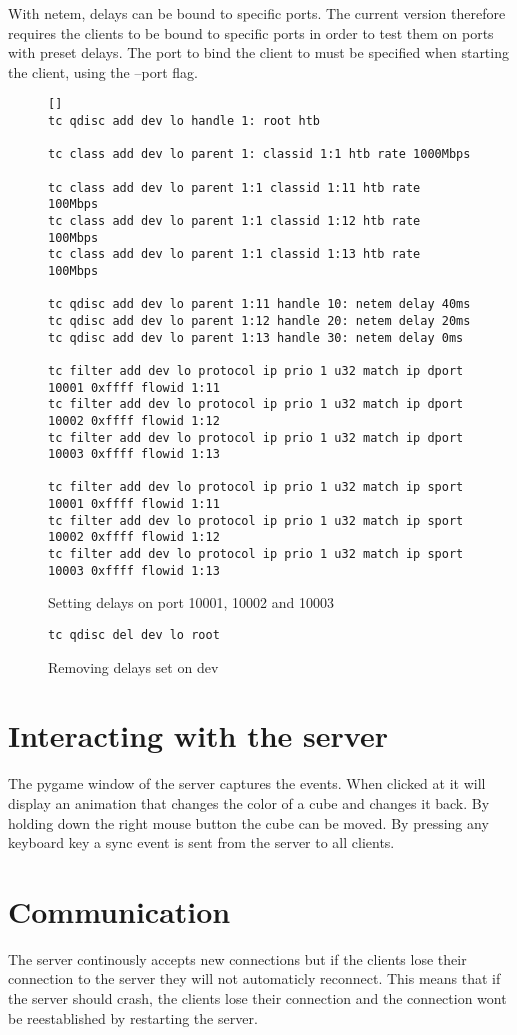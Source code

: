 With netem, delays can be bound to specific ports. The current version therefore requires the clients to be bound to specific ports in order to test them on ports with preset delays. The port to bind the client to must be specified when starting the client, using the --port flag. 

\begin{figure}[h! ]
\begin{verbatim}[]
tc qdisc add dev lo handle 1: root htb

tc class add dev lo parent 1: classid 1:1 htb rate 1000Mbps

tc class add dev lo parent 1:1 classid 1:11 htb rate 100Mbps
tc class add dev lo parent 1:1 classid 1:12 htb rate 100Mbps
tc class add dev lo parent 1:1 classid 1:13 htb rate 100Mbps

tc qdisc add dev lo parent 1:11 handle 10: netem delay 40ms
tc qdisc add dev lo parent 1:12 handle 20: netem delay 20ms
tc qdisc add dev lo parent 1:13 handle 30: netem delay 0ms

tc filter add dev lo protocol ip prio 1 u32 match ip dport 10001 0xffff flowid 1:11
tc filter add dev lo protocol ip prio 1 u32 match ip dport 10002 0xffff flowid 1:12
tc filter add dev lo protocol ip prio 1 u32 match ip dport 10003 0xffff flowid 1:13

tc filter add dev lo protocol ip prio 1 u32 match ip sport 10001 0xffff flowid 1:11
tc filter add dev lo protocol ip prio 1 u32 match ip sport 10002 0xffff flowid 1:12
tc filter add dev lo protocol ip prio 1 u32 match ip sport 10003 0xffff flowid 1:13
\end{verbatim}
\caption{Setting delays on port 10001, 10002 and 10003}
\end{figure}

\begin{figure}[h!]
\begin{verbatim}
tc qdisc del dev lo root
\end{verbatim}
\caption{Removing delays set on dev}
\end{figure}

\section{Interacting with the server}
The pygame window of the server captures the events. When clicked at it will display an animation that changes the color of a cube and changes it back. By holding down the right mouse button the cube can be moved. By pressing any keyboard key a sync event is sent from the server to all clients. 

\section{Communication}
The server continously accepts new connections but if the clients lose their connection to the server they will not automaticly reconnect. This means that if the server should crash, the clients lose their connection and the connection wont be reestablished by restarting the server.


